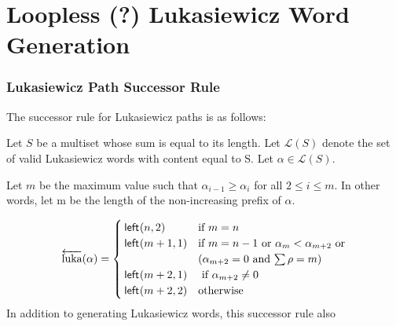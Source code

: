 \chapter{Loopless (?) Lukasiewicz Word Generation}
\subsection{Lukasiewicz Path Successor Rule}
The successor rule for Lukasiewicz paths is as follows:

Let $S$ be a multiset whose sum is equal to its length.  Let $\mathcal{L}(S)$ denote the set of valid Lukasiewicz words with content equal to S. Let $\alpha \in \mathcal{L}(S)$.  

Let $m$ be the maximum value such that $\alpha_{i-1} \ge \alpha_{i}$ for all $2 \le i \le m$. In other words, let m be the length of the non-increasing prefix of $\alpha$.


\begin{equation*}
    \overleftarrow{\text{luka}}(\alpha) = \begin{cases}
	\leftshift{n}{2} & $if $ m=n \\
	\leftshift{m+1}{1} & $if $ m=n-1 $ or $ \alpha_{m} < \alpha_{m+2}  $ or$ \\
    & (\alpha_{m+2} = 0 $ and $ \sum \rho = m) \\
	\leftshift{m+2}{1} & $ if $ \alpha_{m+2} \neq 0 \\
	\leftshift{m+2}{2} & $otherwise$  \\
\end{cases}
\end{equation*}
In addition to generating Lukasiewicz words, this successor rule also 
